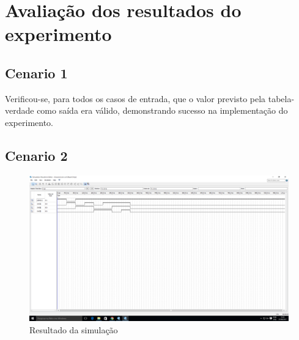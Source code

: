 \chapter{Avaliação dos resultados do experimento}
\section{Cenario 1}
	Verificou-se, para todos os casos de entrada, que o valor previsto pela tabela-verdade
	como saída era válido, demonstrando sucesso na implementação do experimento.

\section{Cenario 2}

	\begin{figure}[H]
	    \centering
		\caption{\label{fig:printSimulacao}Resultado da simulação}
		\includegraphics[width=1\textwidth]{img/cenario2/printSimulacao}
	\end{figure}

